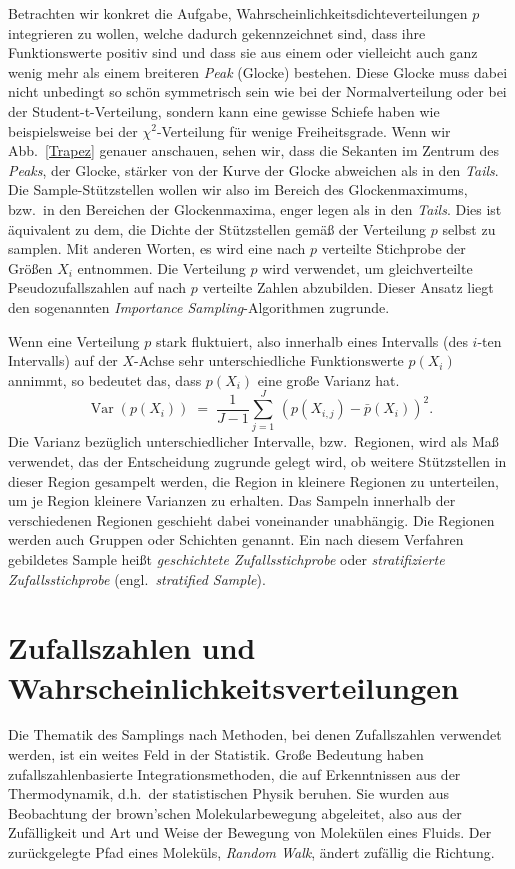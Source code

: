 Betrachten wir konkret die Aufgabe, Wahrscheinlichkeitsdichteverteilungen $p$
integrieren zu wollen, welche dadurch gekennzeichnet sind, dass ihre Funktionswerte
positiv sind und dass sie aus einem
oder vielleicht auch ganz wenig mehr als einem breiteren \textsl{Peak} (Glocke) bestehen.
Diese Glocke muss dabei nicht unbedingt so schön symmetrisch sein wie bei der
Normalverteilung oder bei der Student-t-Verteilung, sondern kann eine gewisse Schiefe haben
wie beispielsweise bei der $\chi^2$-Verteilung für wenige Freiheitsgrade.
Wenn wir Abb.~\ref{Trapez} genauer anschauen, sehen wir, dass die Sekanten im Zentrum
des \textsl{Peaks}, der Glocke, stärker von der Kurve der Glocke abweichen als in den
\textsl{Tails}. Die Sample-Stützstellen wollen wir also im Bereich des Glockenmaximums, bzw.\
in den Bereichen der Glockenmaxima, enger legen als in den \textsl{Tails}. Dies ist äquivalent
zu dem, die Dichte der Stützstellen gemäß der Verteilung $p$ selbst zu samplen.
Mit anderen Worten, es wird eine nach $p$ verteilte Stichprobe der Größen $X_i$
entnommen. Die Verteilung $p$ wird verwendet, um gleichverteilte Pseudozufallszahlen auf nach $p$
verteilte Zahlen abzubilden.
Dieser Ansatz liegt den sogenannten \textsl{Importance Sampling}-Algorithmen zugrunde.

Wenn eine Verteilung $p$ stark fluktuiert, also innerhalb eines
Intervalls (des $i$-ten Intervalls) auf der $X$-Achse sehr unterschiedliche Funktionswerte $p(X_i)$ annimmt,
so bedeutet das, dass $p(X_i)$ eine große Varianz hat.
\begin{equation}
\operatorname{Var}(p(X_i)) \; = \; \frac{1}{J-1} \sum_{j=1}^J \, \left(p(X_{i,j})- \bar p(X_i)\right)^2 .
\end{equation}
Die Varianz bezüglich unterschiedlicher Intervalle, bzw.\ Regionen, wird als Maß verwendet,
das der Entscheidung zugrunde gelegt wird, ob weitere Stützstellen in dieser Region
gesampelt werden, die Region in kleinere Regionen zu unterteilen, um je Region kleinere Varianzen
zu erhalten.
Das Sampeln innerhalb der verschiedenen Regionen geschieht dabei
voneinander unabhängig. Die Regionen werden auch Gruppen oder Schichten genannt.
Ein nach diesem Verfahren gebildetes Sample heißt \textsl{geschichtete Zufallsstichprobe}
oder \textsl{stratifizierte Zufallsstichprobe} (engl.\ \textsl{stratified Sample}).

\section{Zufallszahlen und Wahrscheinlichkeitsverteilungen}
Die Thematik des Samplings nach Methoden, bei denen Zufallszahlen verwendet werden, ist ein
weites Feld in der Statistik. Große Bedeutung haben zufallszahlenbasierte Integrationsmethoden,
die auf Erkenntnissen aus der Thermodynamik, d.h.\ der statistischen Physik beruhen.
Sie wurden aus Beobachtung der brown'schen Molekularbewegung abgeleitet, also aus der
Zufälligkeit und Art und Weise der Bewegung von Molekülen eines Fluids.
Der zurückgelegte Pfad eines Moleküls, \textsl{Random Walk},
ändert zufällig die Richtung.

